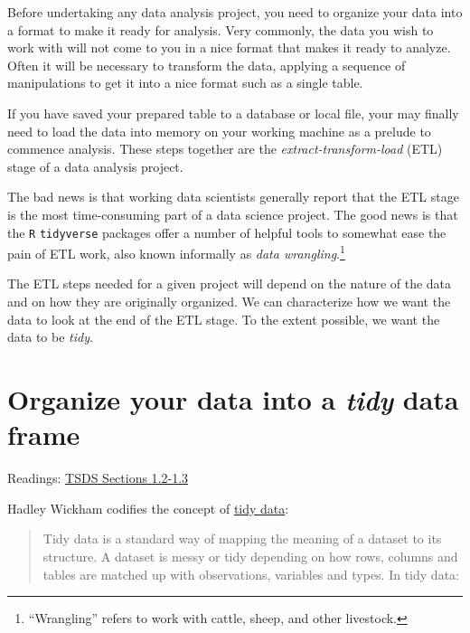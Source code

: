 \documentclass[
]{book}
\begin{document}
Before undertaking any data analysis project, you need to organize your data into a format to make it ready for analysis. Very commonly, the data you wish to work with will not come to you in a nice format that makes it ready to analyze. Often it will be necessary to transform the data, applying a sequence of manipulations to get it into a nice format such as a single table.

If you have saved your prepared table to a database or local file, your may finally need to load the data into memory on your working machine as a prelude to commence analysis. These steps together are the \emph{extract-transform-load} (ETL) stage of a data analysis project.

The bad news is that working data scientists generally report that the ETL stage is the most time-consuming part of a data science project. The good news is that the \texttt{R} \texttt{tidyverse} packages offer a number of helpful tools to somewhat ease the pain of ETL work, also known informally as \emph{data wrangling}.\footnote{``Wrangling'' refers to work with cattle, sheep, and other livestock.}

The ETL steps needed for a given project will depend on the nature of the data and on how they are originally organized. We can characterize how we want the data to look at the end of the ETL stage. To the extent possible, we want the data to be \emph{tidy}.

\hypertarget{organize-your-data-into-a-tidy-data-frame}{%
\section{\texorpdfstring{Organize your data into a \emph{tidy} data frame}{Organize your data into a tidy data frame}}\label{organize-your-data-into-a-tidy-data-frame}}

Readings: \href{https://jhudatascience.org/tidyversecourse/intro.html\#tidy-data}{TSDS Sections 1.2-1.3}

Hadley Wickham \citeyearpar{wickhamTidyData2014} codifies the concept of \href{https://cran.r-project.org/web/packages/tidyr/vignettes/tidy-data.html}{tidy data}:

\begin{quote}
Tidy data is a standard way of mapping the meaning of a dataset to its structure. A dataset is messy or tidy depending on how rows, columns and tables are matched up with observations, variables and types. In tidy data:
\end{quote}
\end{document}
